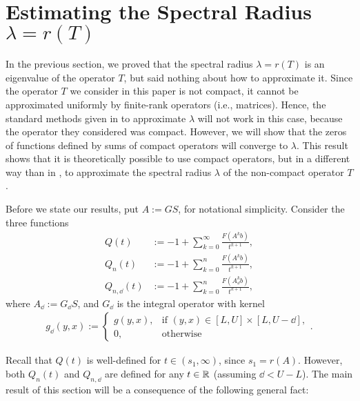 \chapter{Estimating the Spectral Radius $\lambda = r(T)$}

\setcounter{section}{1}

In the previous section, we proved that the spectral radius $\lambda = r(T)$ is an eigenvalue of the operator $T$, but said nothing about how to approximate it. Since the operator $T$ we consider in this paper is not compact, it cannot be approximated uniformly by finite-rank operators (i.e., matrices). Hence, the standard methods given in \cite{Ellner2006} to approximate $\lambda$ will not work in this case, because the operator they considered was compact. However, we will show that the zeros of functions defined by sums of compact operators will converge to $\lambda$. This result shows that it is theoretically possible to use compact operators, but in a different way than in \cite{Ellner2006}, to approximate the spectral radius $\lambda$ of the non-compact operator $T$.

Before we state our results, put $A:=GS$, for notational simplicity. Consider the three functions
\begin{align}
Q(t) &:= -1 + \sum_{k=0}^\infty \frac{F(A^kb)}{t^{k+1}}, \label{eqn:Qdef}\\
Q_n(t) &:= -1 + \sum_{k = 0}^n \frac{F(A^k b)}{t^{k + 1}}, \label{eqn:Qndef} \\
Q_{n, \dd}(t) &:= -1 + \sum_{k = 0}^n \frac{F(A_\dd^k b)}{t^{k + 1}}, \label{eqn:Qnddef}
\end{align}
where $A_\dd := G_\dd S$, and $G_\dd$ is the integral operator with kernel
\begin{align}
	g_\dd(y, x) := \begin{cases} g(y, x), & \text{if } (y, x) \in [L,U] \times [L,U-\dd], \\ 0, & \text{otherwise} \end{cases}. \label{eqn:gdelta}
\end{align}

Recall that $Q(t)$ is well-defined for $t \in (s_1, \infty)$, since $s_1 = r(A)$. However, both $Q_n(t)$ and $Q_{n, \dd}$ are defined for any $t \in \mathbb{R}$ (assuming $\dd < U -L$). The main result of this section will be a consequence of the following general fact:

